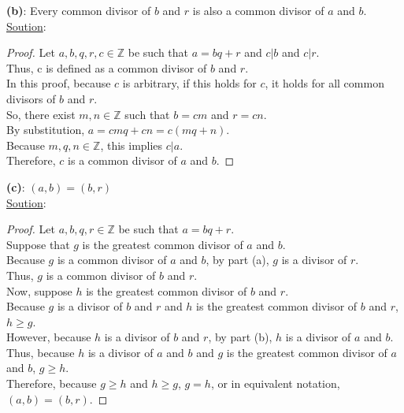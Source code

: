 \documentclass{article} %
\begin{document}
\begin{addmargin}[1em]{0em}
\textbf{(b)}: Every common divisor of $b$ and $r$ is also a common divisor of $a$ and $b$.
\\ \hfill \break
\underline{Soution}:
\begin{addmargin}[1em]{0em}
\begin{proof}
Let $a, b, q, r, c \in \mathbb{Z}$ be such that $a = bq + r$ and $c|b$ and $c|r$.
\\Thus, c is defined as a common divisor of $b$ and $r$.
\\In this proof, because $c$ is arbitrary, if this holds for $c$, it holds for all common divisors of $b$ and $r$.
\\So, there exist $m,n \in \mathbb{Z}$ such that $b = cm$ and $r = cn$.
\\By substitution, $a = cmq + cn = c(mq + n)$.
\\Because $m,q,n \in \mathbb{Z}$, this implies $c|a$.
\\Therefore, $c$ is a common divisor of $a$ and $b$.
\end{proof}
\end{addmargin}
\end{addmargin}
\hfill \break

\begin{addmargin}[1em]{0em}
\textbf{(c)}: $(a,b)=(b,r)$
\\ \hfill \break
\underline{Soution}:
\begin{addmargin}[1em]{0em}
\begin{proof}
Let $a, b, q, r \in \mathbb{Z}$ be such that $a = bq + r$.
\\Suppose that $g$ is the greatest common divisor of $a$ and $b$.
\\Because $g$ is a common divisor of $a$ and $b$, by part (a), $g$ is a divisor of $r$.
\\Thus, $g$ is a common divisor of $b$ and $r$.
\\Now, suppose $h$ is the greatest common divisor of $b$ and $r$.
\\Because $g$ is a divisor of $b$ and $r$ and $h$ is the greatest common divisor of $b$ and $r$, $h \geq g$.
\\However, because $h$ is a divisor of $b$ and $r$, by part (b), $h$ is a divisor of $a$ and $b$.
\\Thus, because $h$ is a divisor of $a$ and $b$ and $g$ is the greatest common divisor of $a$ and $b$, $g \geq h$.
\\Therefore, because $g \geq h$ and $h \geq g$, $g = h$, or in equivalent notation, $(a,b) = (b,r)$.
\end{proof}
\end{addmargin}
\end{addmargin}
\hfill \break
\end{document}
